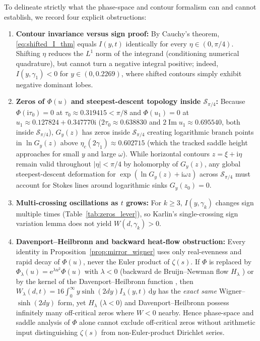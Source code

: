 \documentclass[11pt,a4paper,reqno]{amsart}
\theoremstyle{definition}
\theoremstyle{remark}
\numberwithin{equation}{section}
\newcommand{\dd}{\mathrm{d}}
\newcommand{\ii}{\mathrm{i}}
\newcommand{\ee}{\mathrm{e}}
\newcommand{\Ima}{\operatorname{Im}}
\begin{document}
To delineate strictly what the phase-space and contour formalism can and cannot establish, we record four explicit obstructions:
\begin{enumerate}
\item \textbf{Contour invariance versus sign proof:} By Cauchy's theorem, \eqref{eq:shifted_I_thm} equals $I(y,t)$ identically for every $\eta \in (0,\pi/4)$. Shifting $\eta$ reduces the $L^1$ norm of the integrand (conditioning numerical quadrature), but cannot turn a negative integral positive; indeed, $I(y,\gamma_1) < 0$ for $y \in (0, 0.2269)$, where shifted contours simply exhibit negative dominant lobes.
\item \textbf{Zeros of $\Phi(u)$ and steepest-descent topology inside $\mathcal{S}_{\pi/4}$:} Because $\Phi(\ii\tau_0) = 0$ at $\tau_0 \approx 0.319415 < \pi/8$ and $\Phi(u_1) = 0$ at $u_1 \approx 0.127824 + 0.347770\ii$ ($2\tau_0 \approx 0.638830$ and $2\Ima u_1 \approx 0.695540$, both inside $\mathcal{S}_{\pi/4}$), $G_y(z)$ has zeros inside $\mathcal{S}_{\pi/4}$ creating logarithmic branch points in $\ln G_y(z)$ above $\eta_c(2\gamma_1) \approx 0.602715$ (which the tracked saddle height approaches for small $y$ and large $\omega$). While horizontal contours $z = \xi + \ii\eta$ remain valid throughout $|\eta| < \pi/4$ by holomorphy of $G_y(z)$, any global steepest-descent deformation for $\exp(\ln G_y(z) + \ii\omega z)$ across $\mathcal{S}_{\pi/4}$ must account for Stokes lines around logarithmic sinks $G_y(z_0)=0$.
\item \textbf{Multi-crossing oscillations as $t$ grows:} For $k \ge 3$, $I(y,\gamma_k)$ changes sign multiple times (Table~\ref{tab:zeros_lever}), so Karlin's single-crossing sign variation lemma does not yield $W(d,\gamma_k) > 0$.
\item \textbf{Davenport--Heilbronn and backward heat-flow obstruction:} Every identity in Proposition~\ref{prop:mirror_wigner} uses only real-evenness and rapid decay of $\Phi(u)$, never the Euler product of $\zeta(s)$. If $\Phi$ is replaced by $\Phi_\lambda(u) = \ee^{\lambda u^2}\Phi(u)$ with $\lambda < 0$ (backward de Bruijn--Newman flow $H_\lambda$ \cite{DeBruijn1950,Newman1976,CsordasNorfolkVarga1986}) or by the kernel of the Davenport--Heilbronn function \cite{DavenportHeilbronn1936,Titchmarsh1986}, then $W_\lambda(d,t) = 16\int_0^\infty y\sinh(2d y)I_\lambda(y,t)\,\dd y$ has the \emph{exact same} Wigner--$\sinh(2dy)$ form, yet $H_\lambda$ ($\lambda < 0$) and Davenport--Heilbronn possess infinitely many off-critical zeros where $W < 0$ nearby. Hence phase-space and saddle analysis of $\Phi$ alone cannot exclude off-critical zeros without arithmetic input distinguishing $\zeta(s)$ from non-Euler-product Dirichlet series.
\end{enumerate}
\end{document}
